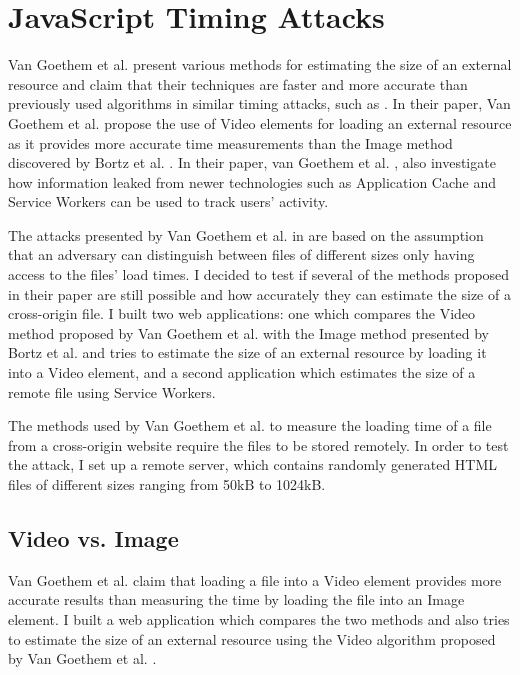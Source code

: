\documentclass[10pt,a4paper,twoside]{book}
\begin{document}
\section{JavaScript Timing Attacks}
Van Goethem et al. \cite{van2015clock} present various methods for estimating the size of an external resource and claim that their techniques are faster and more accurate than previously used algorithms in similar timing attacks, such as \cite{bortz2007exposing}. In their paper, Van Goethem et al. \cite{van2015clock} propose the use of Video elements for loading an external resource as it provides more accurate time measurements than the Image method discovered by Bortz et al. \cite{bortz2007exposing}. In their paper, van Goethem et al. \cite{van2015clock}, also investigate how information leaked from newer technologies such as Application Cache and Service Workers can be used to track users' activity.

The attacks presented by Van Goethem et al. in \cite{van2015clock} are based on the assumption that an adversary can distinguish between files of different sizes only having access to the files' load times. I decided to test if several of the methods proposed in their paper are still possible and how accurately they can estimate the size of a cross-origin file. I built two web applications: one which compares the Video method proposed by Van Goethem et al. \cite{van2015clock} with the Image method presented by Bortz et al. \cite{bortz2007exposing} and tries to estimate the size of an external resource by loading it into a Video element, and a second application which estimates the size of a remote file using Service Workers.

The methods used by Van Goethem et al. \cite{van2015clock} to measure the loading time of a file from a cross-origin website require the files to be stored remotely. In order to test the attack, I set up a remote server, which contains randomly generated HTML files of different sizes ranging from 50kB to 1024kB. 

\subsection{Video vs. Image}
Van Goethem et al. \cite{van2015clock} claim that loading a file into a Video element provides more accurate results than measuring the time by loading the file into an Image element. I built a web application which compares the two methods and also tries to estimate the size of an external resource using the Video algorithm proposed by Van Goethem et al. \cite{van2015clock}.
\end{document}
